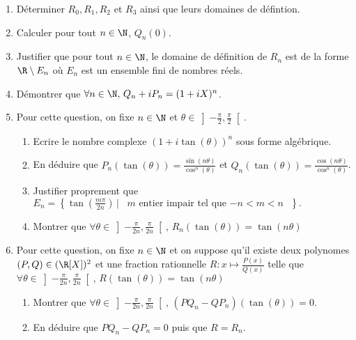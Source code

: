 \documentclass[a4paper, 11pt,reqno]{article}
\begin{document}
\begin{exercice}
\begin{enumerate}
\item Déterminer $R_0,R_1,R_2 $ et $R_3$ ainsi que leurs domaines de défintion. 
\item Calculer pour tout $n\in \N$, $Q_n(0)$. 
\item Justifier que pour tout $n\in \N$, le domaine de définition de $R_n$ est de la forme $\R\setminus E_n$ où $E_n$ est un ensemble fini de nombres réels. 
\item Démontrer que $\forall n \in \N,\, Q_n +iP_n = (1+iX)^n $.
\item Pour cette question, on fixe $n\in \N$ et $\theta \in \left] -\frac{\pi}{2},\frac{\pi}{2}\right[.$
\begin{enumerate}
\item Ecrire le nombre complexe $(1+i \tan(\theta))^n$ sous forme algébrique. 
\item En déduire que $P_n(\tan(\theta) )= \frac{\sin(n\theta)}{\cos^n(\theta)}$ et $Q_n(\tan(\theta) )= \frac{\cos(n\theta)}{\cos^n(\theta)}$.
\item Justifier proprement que $E_n = \left\{ \tan\left( \frac{m\pi}{2n}\right)\,|\, \text{ $m$ entier impair tel que $-n<m<n$ } \right\}.$ 
\item Montrer que $\forall  \theta \in \left] -\frac{\pi}{2n},\frac{\pi}{2n}\right[,\, R_n(\tan(\theta)) =\tan(n\theta)$
\end{enumerate}
\item Pour cette question, on fixe $n\in \N$ et on suppose qu'il existe deux polynomes $(P,Q) \in ( \R[X])^2$ et une fraction rationnelle $R : x\mapsto \frac{P(x)}{Q(x)}$ telle que $\forall  \theta \in \left] -\frac{\pi}{2n},\frac{\pi}{2n}\right[,\, R(\tan(\theta)) =\tan(n\theta)$
\begin{enumerate}
\item Montrer que  $\forall  \theta \in \left] -\frac{\pi}{2n},\frac{\pi}{2n}\right[,\, (PQ_n- QP_n)(\tan(\theta) ) =0$.
\item En déduire que $PQ_n- QP_n=0$ puis que $R=R_n$. 
\end{enumerate}
\end{enumerate}

\end{exercice}
%
%
\end{document}
